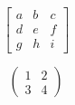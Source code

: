 \documentclass[a4paper,12pt]{report}
\begin{document}
\begin{equation}
\begin{bmatrix}
a & b & c \\ 
d & e & f \\ 
g & h & i
\end{bmatrix} 
\label{matrice}
\end{equation}

\begin{equation}
\begin{pmatrix}
1 & 2 \\ 
3 & 4
\end{pmatrix}
\label{matrice2}
\end{equation}



\end{document}

